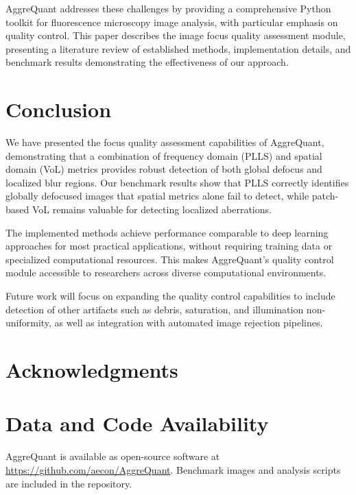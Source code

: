 \documentclass[11pt,a4paper]{article}
\begin{document}
AggreQuant addresses these challenges by providing a comprehensive Python toolkit for fluorescence microscopy image analysis, with particular emphasis on quality control. This paper describes the image focus quality assessment module, presenting a literature review of established methods, implementation details, and benchmark results demonstrating the effectiveness of our approach.



\section{Conclusion}
\label{sec:conclusion}


We have presented the focus quality assessment capabilities of AggreQuant, demonstrating that a combination of frequency domain (PLLS) and spatial domain (VoL) metrics provides robust detection of both global defocus and localized blur regions. Our benchmark results show that PLLS correctly identifies globally defocused images that spatial metrics alone fail to detect, while patch-based VoL remains valuable for detecting localized aberrations.

The implemented methods achieve performance comparable to deep learning approaches for most practical applications, without requiring training data or specialized computational resources. This makes AggreQuant's quality control module accessible to researchers across diverse computational environments.

Future work will focus on expanding the quality control capabilities to include detection of other artifacts such as debris, saturation, and illumination non-uniformity, as well as integration with automated image rejection pipelines.

\section*{Acknowledgments}


\section*{Data and Code Availability}

AggreQuant is available as open-source software at \url{https://github.com/aecon/AggreQuant}. Benchmark images and analysis scripts are included in the repository.




\end{document}
